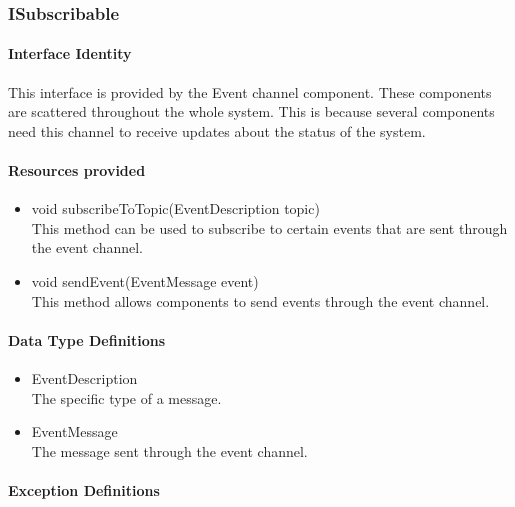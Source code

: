 \subsubsection{ISubscribable}
\paragraph{Interface Identity}
This interface is provided by the Event channel component. These components are
	scattered throughout the whole system. This is because several components need
	this channel to receive updates about the status of the system.
\paragraph{Resources provided}
\begin{itemize}
	\item{void subscribeToTopic(EventDescription topic)}\\
	This method can be used to subscribe to certain events that are sent through
		the event channel.
	\item{void sendEvent(EventMessage event)}\\
	This method allows components to send events through the event channel.
\end{itemize}
\paragraph{Data Type Definitions}
\begin{itemize}
	\item EventDescription\\
	The specific type of a message.
	\item EventMessage\\
	The message sent through the event channel.
\end{itemize}
\paragraph{Exception Definitions}
